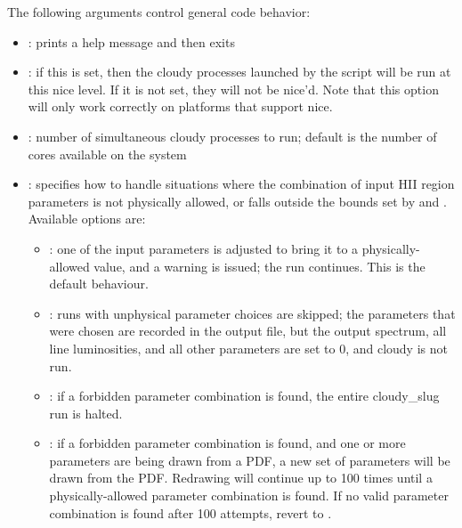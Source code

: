 \documentclass[letterpaper,10pt,english]{sphinxmanual}
\begin{document}
The following arguments control general code behavior:
\begin{itemize}
\item {} 
: prints a help message and then exits

\item {} 
: if this is set, then the
cloudy processes launched by the script will be run at this nice
level. If it is not set, they will not be nice'd. Note that this
option will only work correctly on platforms that support nice.

\item {} 
: number of simultaneous cloudy processes
to run; default is the number of cores available on the system

\item {} 
: specifies how to
handle situations where the combination of input HII region
parameters is not physically allowed, or falls outside the bounds
set by  and . Available options are:
\begin{itemize}
\item {} 
: one of the input parameters is adjusted to bring it
to a physically-allowed value, and a warning is issued; the run
continues. This is the default behaviour.

\item {} 
: runs with unphysical parameter choices are skipped; the
parameters that were chosen are recorded in the output file, but
the output spectrum, all line luminosities, and all other
parameters are set to 0, and cloudy is not run.

\item {} 
: if a forbidden parameter combination is found, the
entire cloudy\_slug run is halted.

\item {} 
: if a forbidden parameter combination is found, and
one or more parameters are being drawn from a PDF, a new set of
parameters will be drawn from the PDF. Redrawing will continue up
to 100 times until a physically-allowed parameter combination is
found. If no valid parameter combination is found after 100
attempts, revert to .

\end{itemize}


\end{itemize}
\end{document}
